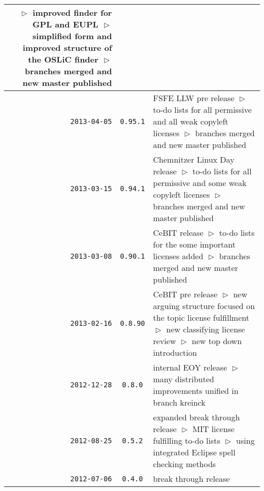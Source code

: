 \begin{table}
\begin{center}
\begin{tabular}{|r|c|p{9.4cm}|}
    $\vartriangleright$ improved finder for GPL and EUPL\newline
    $\vartriangleright$ simplified form and improved structure of the OSLiC finder\newline    
    $\vartriangleright$ branches merged and new master published\\
\hline
    \texttt{2013-04-05}
  & \texttt{0.95.1} 
  & FSFE LLW pre release\newline
    $\vartriangleright$ to-do lists for all permissive and all weak copyleft licenses\newline
    $\vartriangleright$ branches merged and new master published\\
\hline
    \texttt{2013-03-15}
  & \texttt{0.94.1} 
  & Chemnitzer Linux Day release\newline
    $\vartriangleright$ to-do lists for all permissive and some weak copyleft licenses\newline
    $\vartriangleright$ branches merged and new master published\\
\hline
    \texttt{2013-03-08}
  & \texttt{0.90.1} 
  & CeBIT release\newline
    $\vartriangleright$ to-do lists for the some important licenses added\newline
    $\vartriangleright$ branches merged and new master published\\
\hline
    \texttt{2013-02-16}
  & \texttt{0.8.90} 
  & CeBIT pre release\newline
    $\vartriangleright$ new arguing structure focused on the topic license fulfillment\newline
    $\vartriangleright$ new classifying license review\newline   
    $\vartriangleright$ new top down introduction\\
\hline
    \texttt{2012-12-28}
  & \texttt{0.8.0} 
  & internal EOY release\newline
    $\vartriangleright$ many distributed improvements unified in branch kreinck\\
\hline
    \texttt{2012-08-25}
  & \texttt{0.5.2} 
  & expanded break through release\newline
    $\vartriangleright$ MIT license fulfilling to-do lists\newline
    $\vartriangleright$ using integrated Eclipse spell checking methods\\
\hline
    \texttt{2012-07-06}
  & \texttt{0.4.0} 
  & break through release\newline

\end{tabular}
\end{center}
\end{table}
